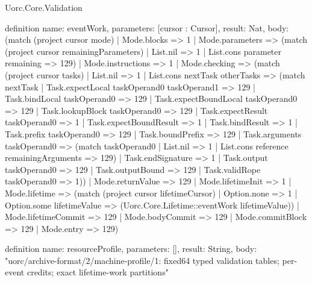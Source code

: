 \begin{lexlean}{Uorc.Core.Validation}
\begin{semanticmodule}
definition{
  name: eventWork,
  parameters: [cursor : Cursor],
  result: Nat,
  body: (match (project cursor mode)
    | Mode.blocks => 1
    | Mode.parameters => (match (project cursor remainingParameters)
      | List.nil => 1
      | List.cons parameter remaining => 129)
    | Mode.instructions => 1
    | Mode.checking => (match (project cursor tasks)
      | List.nil => 1
      | List.cons nextTask otherTasks => (match nextTask
        | Task.expectLocal taskOperand0 taskOperand1 => 129
        | Task.bindLocal taskOperand0 => 129
        | Task.expectBoundLocal taskOperand0 => 129
        | Task.lookupBlock taskOperand0 => 129
        | Task.expectResult taskOperand0 => 1
        | Task.expectBoundResult => 1
        | Task.bindResult => 1
        | Task.prefix taskOperand0 => 129
        | Task.boundPrefix => 129
        | Task.arguments taskOperand0 => (match taskOperand0
          | List.nil => 1
          | List.cons reference remainingArguments => 129)
        | Task.endSignature => 1
        | Task.output taskOperand0 => 129
        | Task.outputBound => 129
        | Task.validRope taskOperand0 => 1))
    | Mode.returnValue => 129
    | Mode.lifetimeInit => 1
    | Mode.lifetime => (match (project cursor lifetimeCursor)
      | Option.none => 1
      | Option.some lifetimeValue => (Uorc.Core.Lifetime::eventWork lifetimeValue))
    | Mode.lifetimeCommit => 129
    | Mode.bodyCommit => 129
    | Mode.commitBlock => 129
    | Mode.entry => 129)
}

definition{
  name: resourceProfile,
  parameters: [],
  result: String,
  body: "uorc/archive-format/2/machine-profile/1: fixed64 typed validation tables; per-event credits; exact lifetime-work partitions"
}


\end{semanticmodule}
\end{lexlean}
